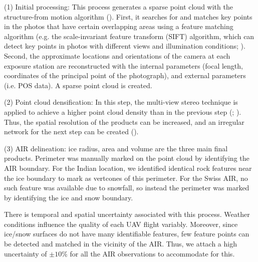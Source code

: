 \documentclass[utf8]{frontiersSCNS} %
\begin{document}
(1) Initial processing: This process generates a sparse point cloud with the structure-from motion algorithm
(\cite{Turner_2012}). First, it searches for and matches key points in the photos that have certain overlapping
areas using a feature matching algorithm (e.g. the scale-invariant feature transform (SIFT) algorithm, which can
detect key points in photos with different views and illumination conditions; \cite{Lowe_2004}). Second, the
approximate locations and orientations of the camera at each exposure station are reconstructed with the internal
parameters (focal length, coordinates of the principal point of the photograph), and external parameters (i.e. POS
data). A sparse point cloud is created.

(2) Point cloud densification: In this step, the multi-view stereo technique is applied to achieve a higher point
cloud density than in the previous step (\cite{Furukawa_2010}; \cite{Molg_2017}). Thus, the spatial resolution of
the products can be increased, and an irregular network for the next step can be created (\cite{Kung_2011}).

(3) AIR delineation: ice radius, area and volume are the three main final products. Perimeter was manually marked
on the point cloud by identifying the AIR boundary. For the Indian location, we identified identical rock features
near the ice boundary to mark as vertcones of this perimeter. For the Swiss AIR, no such feature was available due
to snowfall, so instead the perimeter was marked by identifying the ice and snow boundary.

There is temporal and spatial uncertainty associated with this process. Weather conditions influence the quality
of each UAV flight variably. Moreover, since ice/snow surfaces do not have many identifiable features, few
feature points can be detected and matched in the vicinity of the AIR. Thus, we attach a high uncertainty of
$\pm 10 \%$ for all the AIR observations to accommodate for this.
\end{document}
